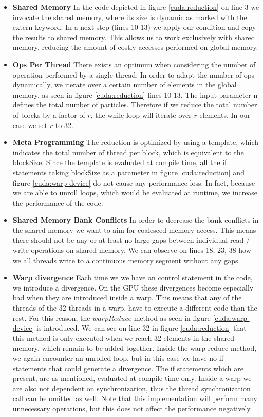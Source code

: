 \documentclass[]{article}
\begin{document}
\begin{itemize}
	\item \textbf{Shared Memory} 
	In the code depicted in figure \ref{cuda:reduction} on line 3 we invocate the shared memory, where its size is dynamic as marked with the extern keyword. In a next step (lines 10-13) we apply our condition and copy the results to shared memory. This allows us to work exclusively with shared memory, reducing the amount of costly accesses performed on global memory.
	
	\item \textbf{Ops Per Thread} There exists an optimum when considering the number of operation performed by a single thread. In order to adapt the number of ops dynamically, we iterate over a certain number of elements in the global memory, as seen in figure \ref{cuda:reduction} lines 10-13. The input parameter n defines the total number of particles. Therefore if we reduce the total number of blocks by a factor of $r$, the while loop will iterate over $r$ elements. In our case we set $r$ to 32. 
	
	\item \textbf{Meta Programming} The reduction is optimized by using a template, which indicates the total number of thread per block, which is equivalent to the blockSize. Since the template is evaluated at compile time, all the if statements taking blockSize as a parameter in figure \ref{cuda:reduction} and figure \ref{cuda:warp-device} do not cause any performance loss. In fact, because we are able to unroll loops, which would be evaluated at runtime, we increase the performance of the code. 

	\item \textbf{Shared Memory Bank Conflicts} In order to decrease the bank conflicts in the shared memory we want to aim for coalesced memory access. This means there should not be any or at least no large gaps between individual read / write operations on shared memory. We can observe on lines 18, 23, 38 how we all threads write to a continuous memory segment without any gaps. 
	
	\item \textbf{Warp divergence} Each time we we have an control statement in the code, we introduce a divergence. On the GPU these divergences become especially bad when they are introduced inside a warp. This means that any of the threads of the 32 threads in a warp, have to execute a different code than the rest. For this reason, the $warpReduce$ method as seen in figure \ref{cuda:warp-device} is introduced. We can see on line 32 in figure \ref{cuda:reduction} that this method is only executed when we reach 32 elements in the shared memory, which remain to be added together. Inside the warp reduce method, we again encounter an unrolled loop, but in this case we have no if statements that could generate a divergence. The if statements which are present, are as mentioned, evaluated at compile time only. Inside a warp we are also not dependent on synchronization, thus the thread synchronization call can be omitted as well. Note that this implementation will perform many unnecessary operations, but this does not affect the performance negatively.
	

\end{itemize}
\end{document}
